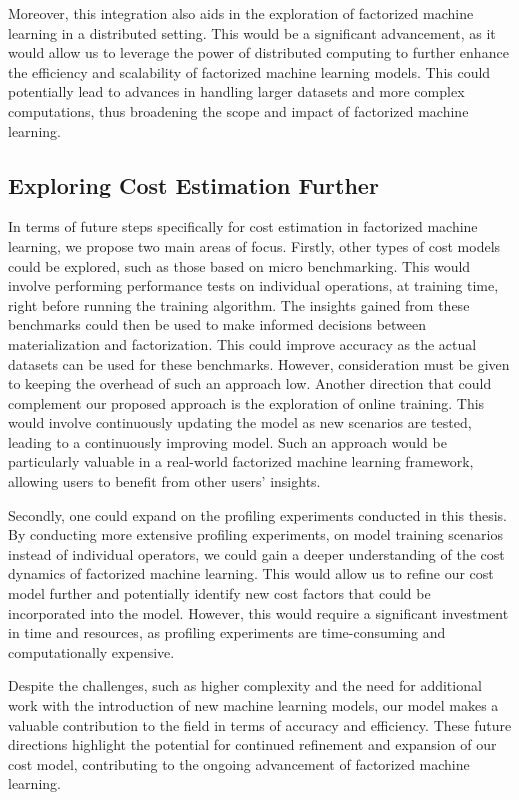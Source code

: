 Moreover, this integration also aids in the exploration of factorized machine learning in a distributed setting. This would be a significant advancement, as it would allow us to leverage the power of distributed computing to further enhance the efficiency and scalability of factorized machine learning models. This could potentially lead to advances in handling larger datasets and more complex computations, thus broadening the scope and impact of factorized machine learning.

\subsection{Exploring Cost Estimation Further}
In terms of future steps specifically for cost estimation in factorized machine learning, we propose two main areas of focus. Firstly, other types of cost models could be explored, such as those based on micro benchmarking. This would involve performing performance tests on individual operations, at training time, right before running the training algorithm. The insights gained from these benchmarks could then be used to make informed decisions between materialization and factorization. This could improve accuracy as the actual datasets can be used for these benchmarks. However, consideration must be given to keeping the overhead of such an approach low. Another direction that could complement our proposed approach is the exploration of online training. This would involve continuously updating the model as new scenarios are tested, leading to a continuously improving model. Such an approach would be particularly valuable in a real-world factorized machine learning framework, allowing users to benefit from other users' insights.

Secondly, one could expand on the profiling experiments conducted in this thesis. By conducting more extensive profiling experiments, on model training scenarios instead of individual operators, we could gain a deeper understanding of the cost dynamics of factorized machine learning. This would allow us to refine our cost model further and potentially identify new cost factors that could be incorporated into the model. However, this would require a significant investment in time and resources, as profiling experiments are time-consuming and computationally expensive.

Despite the challenges, such as higher complexity and the need for additional work with the introduction of new machine learning models, our model makes a valuable contribution to the field in terms of accuracy and efficiency. These future directions highlight the potential for continued refinement and expansion of our cost model, contributing to the ongoing advancement of factorized machine learning.